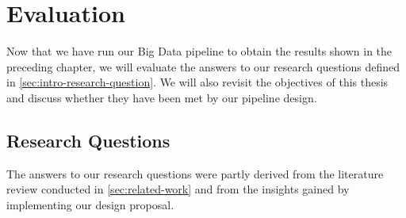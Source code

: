 \section{Evaluation}
\label{sec:evaluation}

Now that we have run our Big Data pipeline to obtain the results shown in the preceding chapter, we will evaluate the answers to our research questions defined in \cref{sec:intro-research-question}.
We will also revisit the objectives of this thesis and discuss whether they have been met by our pipeline design.

\subsection{Research Questions}
\label{sec:evaluation-rq}

The answers to our research questions were partly derived from the literature review conducted in \cref{sec:related-work} and from the insights gained by implementing our design proposal.

